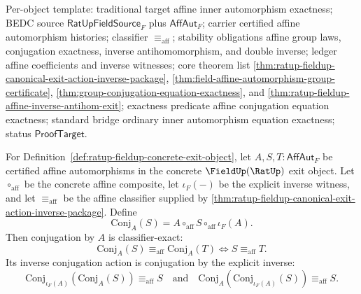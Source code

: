 Per-object template: traditional target affine inner automorphism exactness;
BEDC source $\mathsf{RatUpFieldSource}_F$ plus $\mathsf{AffAut}_F$; carrier
certified affine automorphism histories; classifier $\equiv_{\mathrm{aff}}$;
stability obligations affine group laws, conjugation exactness, inverse
antihomomorphism, and double inverse; ledger affine coefficients and inverse
witnesses; core theorem list
\autoref{thm:ratup-fieldup-canonical-exit-action-inverse-package},
\autoref{thm:field-affine-automorphism-group-certificate},
\autoref{thm:group-conjugation-equation-exactness}, and
\autoref{thm:ratup-fieldup-affine-inverse-antihom-exit}; exactness predicate
affine conjugation equation exactness; standard bridge ordinary inner
automorphism equation exactness; status $\mathsf{ProofTarget}$.

\begin{theorem}
\label{thm:ratup-fieldup-affine-conjugation-exactness}
For Definition~\ref{def:ratup-fieldup-concrete-exit-object}, let
$A,S,T:\mathsf{AffAut}_F$ be certified affine automorphisms in the concrete
$\FieldUp(\RatUp)$ exit object. Let $\circ_{\mathrm{aff}}$ be the concrete
affine composite, let $\iota_F(-)$ be the explicit inverse witness, and let
$\equiv_{\mathrm{aff}}$ be the affine classifier supplied by
\autoref{thm:ratup-fieldup-canonical-exit-action-inverse-package}. Define
$$
\mathrm{Conj}_A(S)=A\circ_{\mathrm{aff}}S\circ_{\mathrm{aff}}\iota_F(A).
$$
Then conjugation by $A$ is classifier-exact:
$$
\mathrm{Conj}_A(S)\equiv_{\mathrm{aff}}\mathrm{Conj}_A(T)
\Longleftrightarrow S\equiv_{\mathrm{aff}}T.
$$
Its inverse conjugation action is conjugation by the explicit inverse:
$$
\mathrm{Conj}_{\iota_F(A)}(\mathrm{Conj}_A(S))
\equiv_{\mathrm{aff}}S
\quad\text{and}\quad
\mathrm{Conj}_A(\mathrm{Conj}_{\iota_F(A)}(S))
\equiv_{\mathrm{aff}}S.
$$
\end{theorem}
